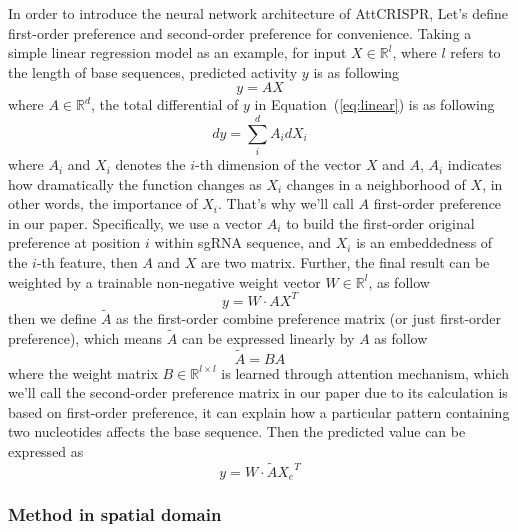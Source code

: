 \documentclass{bioinfo}
\begin{document}
In order to introduce the neural network architecture of AttCRISPR, Let's define first-order preference and second-order preference for convenience. 
Taking a simple linear regression model as an example, for input $X\in\mathbb{R}^l$, where $l$ refers to the length of base sequences, predicted activity $y$ is as following
\begin{equation}
y = AX\label{eq:linear}
\end{equation}
where $A \in\mathbb{R}^d$, the total differential of $y$ in Equation~(\ref{eq:linear}) is as following
\begin{equation}
dy = \sum^{d}_iA_idX_i\label{eq:02}
\end{equation}
where $A_i$ and $X_i$ denotes the $i$-th dimension of the vector $X$ and $A$, 
$A_i$ indicates how dramatically the function changes as $X_i$ changes in a neighborhood of $X$, 
in other words, the importance of $X_i$. 
That's why we'll call $A$ first-order preference in our paper. 
Specifically, we use a vector $A_i$ to build the first-order original preference at position $i$ within sgRNA sequence, 
and $X_i$ is an embeddedness of the $i$-th feature, then $A$ and $X$ are two matrix. 
Further, the final result can be weighted by a trainable non-negative weight vector $W\in\mathbb{R}^l$, as follow
\begin{equation}
y=W \cdot AX^{T}\label{eq:superlinear}
\end{equation}
then we define $\tilde{A}$ as the first-order combine preference matrix (or just first-order preference), which means $\tilde{A}$ can be expressed linearly by $A$ as follow
\begin{equation}
\tilde{A}=BA\label{eq:04}
\end{equation}
where the weight matrix $B\in\mathbb{R}^{l\times l}$ is learned through attention mechanism, 
which we'll call the second-order preference matrix in our paper due to its calculation is based on first-order preference, 
it can explain how a particular pattern containing two nucleotides affects the base sequence. 
Then the predicted value can be expressed as
\begin{equation}
y=W \cdot \tilde{A} {X_e}^{T}\label{eq:05}
\end{equation}

\subsubsection{Method in spatial domain}
\end{document}
